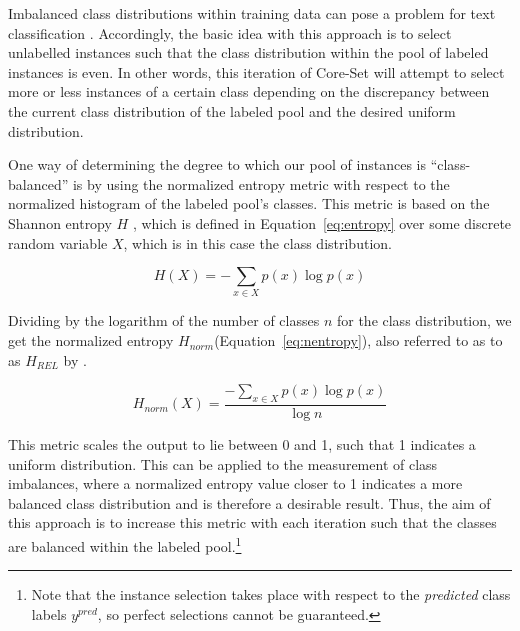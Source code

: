 \documentclass[english,bachelor,ul]{webisthesis} %
\begin{document}
Imbalanced class distributions within training data can pose a problem for text classification \citep{DBLP:conf/eacl/HenningBFF23}. Accordingly, the basic idea with this approach is to select unlabelled instances such that the class distribution within the pool of labeled instances is even. In other words, this iteration of Core-Set will attempt to select more or less instances of a certain class depending on the discrepancy between the current class distribution of the labeled pool and the desired uniform distribution.

One way of determining the degree to which our pool of instances is ``class-balanced'' is by using the normalized entropy metric with respect to the normalized histogram of the labeled pool's classes. This metric is based on the Shannon entropy $ H $ \citep{DBLP:journals/bstj/Shannon48}, which is defined in Equation~\ref{eq:entropy} over some discrete random variable $ X $, which is in this case the class distribution.

\begin{equation}\label{eq:entropy}
    H(X) = -\sum_{x \in X} p(x) \log p(x)
\end{equation}

\noindent Dividing by the logarithm of the number of classes $n$ for the class distribution, we get the normalized entropy $ H_{norm} $(Equation~\ref{eq:nentropy}), also referred to as to as $ H_{REL} $ by \cite{wilcox1967indices}.

\begin{equation}\label{eq:nentropy}
    H_{norm}(X) = \frac{-\sum_{x \in X} p(x) \log p(x)}{\log n}
\end{equation}

\noindent This metric scales the output to lie between 0 and 1, such that 1 indicates a uniform distribution. This can be applied to the measurement of class imbalances, where a normalized entropy value closer to 1 indicates a more balanced class distribution and is therefore a desirable result. Thus, the aim of this approach is to increase this metric with each iteration such that the classes are balanced within the labeled pool.\footnote{Note that the instance selection takes place with respect to the \textit{predicted} class labels $ y^{pred} $, so perfect selections cannot be guaranteed.}
\end{document}
